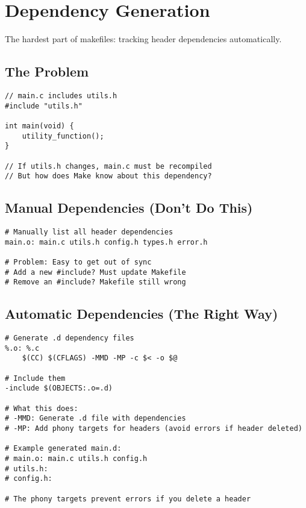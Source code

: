 \section{Dependency Generation}

The hardest part of makefiles: tracking header dependencies automatically.

\subsection{The Problem}

\begin{lstlisting}
// main.c includes utils.h
#include "utils.h"

int main(void) {
    utility_function();
}

// If utils.h changes, main.c must be recompiled
// But how does Make know about this dependency?
\end{lstlisting}

\subsection{Manual Dependencies (Don't Do This)}

\begin{lstlisting}
# Manually list all header dependencies
main.o: main.c utils.h config.h types.h error.h

# Problem: Easy to get out of sync
# Add a new #include? Must update Makefile
# Remove an #include? Makefile still wrong
\end{lstlisting}

\subsection{Automatic Dependencies (The Right Way)}

\begin{lstlisting}
# Generate .d dependency files
%.o: %.c
	$(CC) $(CFLAGS) -MMD -MP -c $< -o $@

# Include them
-include $(OBJECTS:.o=.d)

# What this does:
# -MMD: Generate .d file with dependencies
# -MP: Add phony targets for headers (avoid errors if header deleted)

# Example generated main.d:
# main.o: main.c utils.h config.h
# utils.h:
# config.h:

# The phony targets prevent errors if you delete a header
\end{lstlisting}

